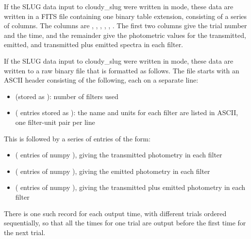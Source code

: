 \documentclass[letterpaper,10pt,english]{sphinxmanual}
\begin{document}
If the SLUG data input to cloudy\_slug were written in  mode,
these data are written in a FITS file containing one binary table
extension, consisting of a series of columns. The columns are
, , , ,
, . The first two columns
give the trial number and the time, and the remainder give the
photometric values for the transmitted, emitted, and transmitted plus
emitted spectra in each filter.

If the SLUG data input to cloudy\_slug were written in  mode,
these data are written to a raw binary file that is formatted as
follows. The file starts with an ASCII header consisting of the
following, each on a separate line:
\begin{itemize}
\item {} 
 (stored as ): number of filters used

\item {} 
  ( entries stored as ): the name and units for each filter are listed in ASCII, one
filter-unit pair per line

\end{itemize}

This is followed by a series of entries of the form:
\begin{itemize}
\item {} 
 ( entries of numpy
), giving the transmitted photometry in each filter

\item {} 
 ( entries of numpy
), giving the emitted photometry in each filter

\item {} 
 ( entries of numpy
), giving the transmitted plus emitted photometry in each
filter

\end{itemize}

There is one such record for each output time, with different trials
ordered sequentially, so that all the times for one trial are output
before the first time for the next trial.
\end{document}
